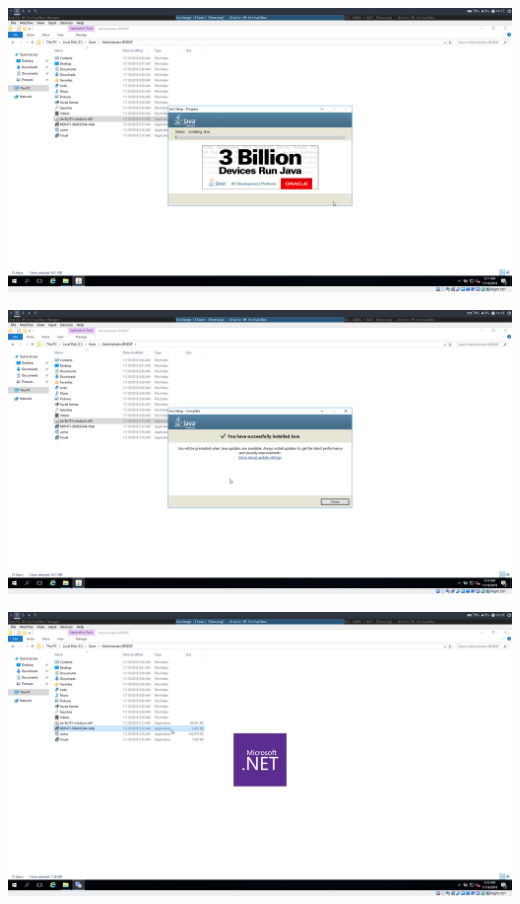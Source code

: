 \documentclass[a4paper]{article}
\begin{document}
	\begin{center}
	\includegraphics[width=15cm]{Pictures/Exchange/Pre/1542633460.png}
\end{center}
	\begin{center}
	\includegraphics[width=15cm]{Pictures/Exchange/Pre/1542633487.png}
\end{center}
	\begin{center}
	\includegraphics[width=15cm]{Pictures/Exchange/Pre/1542633495.png}
\end{center}
\end{document}
